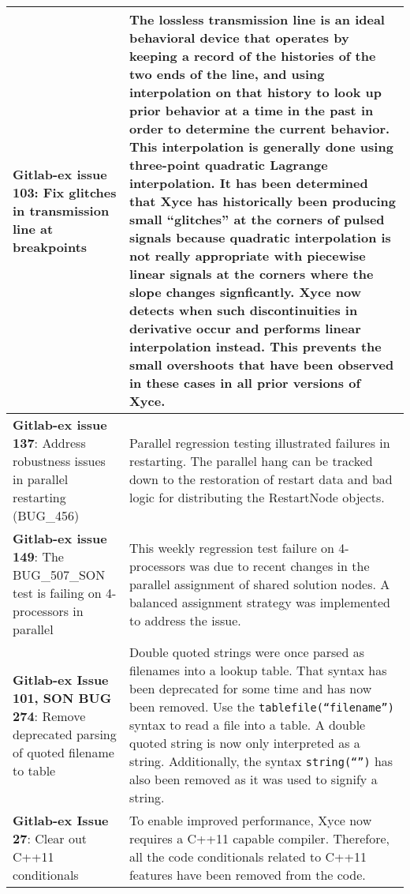 {\begin{longtable}[h] {>{\raggedright\small}m{2in}|>{\raggedright\let\\\tabularnewline\small}m{3.5in}}
\textbf{Gitlab-ex issue 103}: Fix glitches in transmission line at breakpoints &
The lossless transmission line is an ideal behavioral device that
operates by keeping a record of the histories of the two ends of the
line, and using interpolation on that history to look up prior
behavior at a time in the past in order to determine the current
behavior.  This interpolation is generally done using three-point
quadratic Lagrange interpolation.  It has been determined that Xyce
has historically been producing small ``glitches'' at the corners of
pulsed signals because quadratic interpolation is not really
appropriate with piecewise linear signals at the corners where the
slope changes signficantly.  Xyce now detects when such
discontinuities in derivative occur and performs linear interpolation
instead.  This prevents the small overshoots that have been observed
in these cases in all prior versions of Xyce. \\ \hline

\textbf{Gitlab-ex issue 137}: Address robustness issues in parallel restarting (BUG\_456) &
Parallel regression testing illustrated failures in restarting.  The parallel hang 
can be tracked down to the restoration of restart data and bad logic for
distributing the RestartNode objects. \\ \hline

\textbf{Gitlab-ex issue 149}: The BUG\_507\_SON test is failing on 4-processors in parallel &
This weekly regression test failure on 4-processors was due to recent changes in the 
parallel assignment of shared solution nodes.  A balanced assignment strategy was 
implemented to address the issue. \\ \hline

\textbf{Gitlab-ex Issue 101, SON BUG 274}:  Remove deprecated parsing of quoted filename to table &
Double quoted strings were once parsed as filenames into a lookup table.  That syntax 
has been deprecated for some time and has now been removed. Use the \texttt{tablefile(``filename'')}
syntax to read a file into a table.  A double quoted string is 
now only interpreted as a string.  Additionally, the syntax \texttt{string(``'')} 
has also been removed as it was used to signify a string.
\\ \hline

\textbf{Gitlab-ex Issue 27}:  Clear out C++11 conditionals&
To enable improved performance, Xyce now requires a C++11 capable compiler.
Therefore, all the code conditionals related to C++11 features have been
removed from the code. 
\\ \hline


\end{longtable}}
